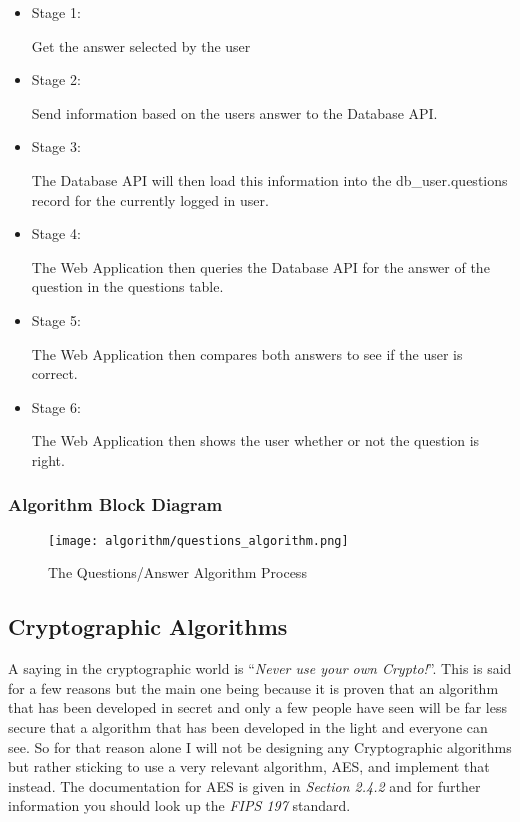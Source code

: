 \begin{itemize}
    \item{Stage 1: 

            Get the answer selected by the user}
    \item{Stage 2: 

            Send information based on the users answer to the Database API.}
    \item{Stage 3: 

            The Database API will then load this information into the db_user.questions record for the currently
            logged in user.}
    \item{Stage 4: 

            The Web Application then queries the Database API for the answer of the question in the questions table.}
    \item{Stage 5:

            The Web Application then compares both answers to see if the user is correct.}
    \item{Stage 6:

            The Web Application then shows the user whether or not the question is right.}
\end{itemize}

\subsubsection{Algorithm Block Diagram}

\begin{figure}[H]
\begin{center}
\texttt{[image: algorithm/questions\_algorithm.png]}
\end{center}
\caption{The Questions/Answer Algorithm Process}
\label{questions_algorithm}
\end{figure}

\subsection{Cryptographic Algorithms}

A saying in the cryptographic world is ``\textit{Never use your own Crypto!}''. This is said for a few reasons but the main one being because it is proven that an algorithm that has been developed in secret and only a few people have seen will be far less secure that a algorithm that has been developed in the light and everyone can see. So for that reason alone I will not be designing any Cryptographic algorithms but rather sticking to use a very relevant algorithm, AES, and implement that instead. The documentation for AES is given in \textit{Section 2.4.2} and for further information you should look up the \textit{FIPS 197} standard.

